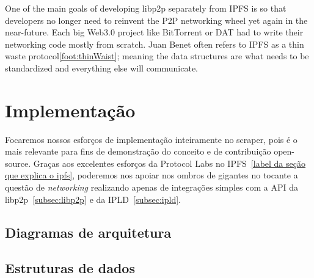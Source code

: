 One of the main goals of developing libp2p separately from IPFS is so that developers no longer need to reinvent the P2P networking wheel yet again in the near-future.
Each big Web3.0 project like BitTorrent or DAT had to write their networking code mostly from scratch.
Juan Benet often refers to IPFS as a thin waste protocol\ref{foot:thinWaist}; meaning the data structures are what needs to be standardized and everything else will communicate.

\section{Implementação}

Focaremos nossos esforços de implementação inteiramente no scraper, pois é o mais relevante para fins de demonstração do conceito e de contribuição open-source.
Graças aos excelentes esforços da Protocol Labs no IPFS~\ref{label da seção que explica o ipfs}, poderemos nos apoiar nos ombros de gigantes no tocante a questão de \textit{networking} realizando apenas de integrações simples com a API da libp2p~\ref{subsec:libp2p} e da IPLD~\ref{subsec:ipld}.

\subsection{Diagramas de arquitetura}

\subsection{Estruturas de dados}

